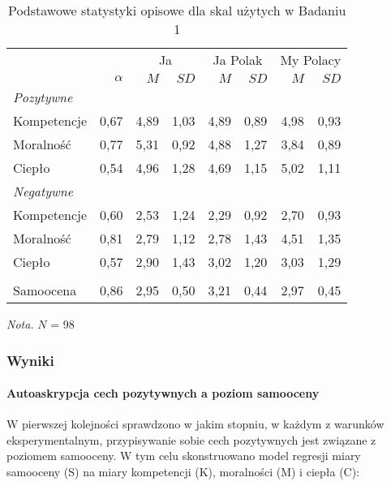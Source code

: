 \documentclass[man]{apa6}
\begin{document}
\begin{table*}[htbp]
\vspace*{2em}
\centering
\begin{threeparttable}
\caption{Podstawowe statystyki opisowe dla skal użytych w Badaniu 1}
\label{tab:0}
\begin{tabular}{lrrrrrrr}
\midrule
\multicolumn{2}{c}{ } & \multicolumn{2}{c}{Ja} & \multicolumn{2}{c}{Ja Polak} & \multicolumn{2}{c}{My Polacy} \\
\cline{3-4}\cline{5-8}
            & $\alpha$ & $M$ & $SD$ & $M$ & $SD$ & $M$ & $SD$ \\
\midrule
\emph{Pozytywne} \\
Kompetencje & 0,67 & 4,89 & 1,03 & 4,89 & 0,89 & 4,98 & 0,93 \\
Moralność   & 0,77 & 5,31 & 0,92 & 4,88 & 1,27 & 3,84 & 0,89 \\
Ciepło      & 0,54 & 4,96 & 1,28 & 4,69 & 1,15 & 5,02 & 1,11 \\
\emph{Negatywne} \\
Kompetencje & 0,60 & 2,53 & 1,24 & 2,29 & 0,92 & 2,70 & 0,93 \\
Moralność   & 0,81 & 2,79 & 1,12 & 2,78 & 1,43 & 4,51 & 1,35 \\
Ciepło      & 0,57 & 2,90 & 1,43 & 3,02 & 1,20 & 3,03 & 1,29 \\
\\
Samoocena & 0,86 & 2,95 & 0,50 & 3,21 & 0,44 & 2,97 & 0,45 \\
\midrule
\end{tabular}

\begin{tablenotes}
{\small
\textit{Nota.} $N$ = 98
}
\end{tablenotes}
\end{threeparttable}

\end{table*}


\subsubsection{Wyniki}
\paragraph{Autoaskrypcja cech pozytywnych a poziom samooceny}
W pierwszej kolejności sprawdzono w jakim stopniu, w każdym z warunków eksperymentalnym, przypisywanie sobie cech pozytywnych jest związane z poziomem samooceny. W tym celu skonstruowano model regresji miary samooceny (S) na miary kompetencji (K), moralności (M) i ciepła (C):
\end{document}
